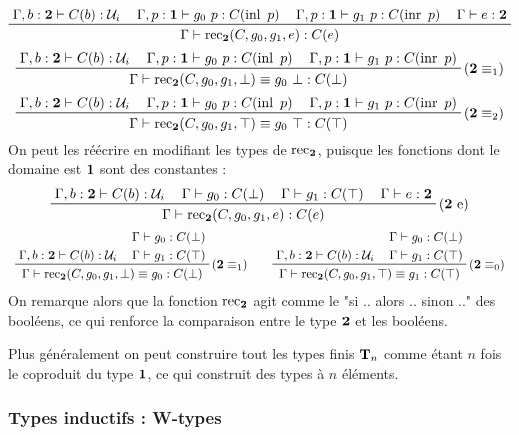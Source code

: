 \documentclass[../../rapport.tex]{subfiles}
\begin{document}
\begin{example}[Le type $\2$]
    $$
    \prfinterspace=1.2em
    \prftree
      {\Gamma, b : \2 \vdash C(b) :\U_i}
      {\Gamma, p : \1 \vdash g_0\ p : C(\inl\ p)}
      {\Gamma, p : \1 \vdash g_1\ p : C(\inr\ p)}
      {\Gamma \vdash e : \2}
      {\Gamma \vdash \rec_{\2}(C, g_0, g_1, e) : C(e)}
    $$
    $$
    \prfinterspace=1.2em
    \prftree[r]{($\2 \equiv_1$)}
      {\Gamma, b: \2 \vdash C(b) : \U_i}
      {\Gamma, p : \1 \vdash g_0\ p : C(\inl\ p)}
      {\Gamma, p : \1 \vdash g_1\ p : C(\inr\ p)}
    {\Gamma \vdash \rec_{\2}(C, g_0, g_1, \bot) \equiv g_0\ \bot : C(\bot)}
    $$
    $$
    \prfinterspace=1.2em
    \prftree[r]{($\2 \equiv_2$)}
      {\Gamma, b: \2 \vdash C(b) : \U_i}
      {\Gamma, p : \1 \vdash g_0\ p : C(\inl\ p)}
      {\Gamma, p : \1 \vdash g_1\ p : C(\inr\ p)}
    {\Gamma \vdash \rec_{\2}(C, g_0, g_1, \top) \equiv g_0\ \top : C(\top)}
    $$
    On peut les réécrire en modifiant les types de $\operatorname{rec}_{\operatorname{\textbf{2}}}$, puisque les fonctions dont le domaine est $\operatorname{\textbf{1}}$ sont des constantes :
    $$
    \prfinterspace=1.2em
    \prftree[r]{($\2$ e)}
      {\Gamma, b : \2 \vdash C(b) :\U_i}
      {\Gamma \vdash g_0: C(\bot)}
      {\Gamma \vdash g_1 : C(\top)}
      {\Gamma \vdash e : \2}
      {\Gamma \vdash \rec_{\2}(C, g_0, g_1, e) : C(e)}
    $$
    $$\begin{array}{cc}
      \prfinterspace=1.2em
      \prftree[r]{($\2 \equiv_1$)}
	{\Gamma, b : \2 \vdash C(b) : \U_i}
	{\prfStackPremises{\Gamma \vdash g_0 : C(\bot)}
	{\Gamma \vdash g_1 : C(\top)}}
      {\Gamma \vdash \rec_{\2}(C, g_0, g_1, \bot) \equiv g_0 : C(\bot)} \hspace{1em}
      &
      \prfinterspace=1.2em
      \prftree[r]{($\2 \equiv_0$)}
	{\Gamma, b : \2 \vdash C(b) : \U_i}
	{\prfStackPremises{\Gamma \vdash g_0 : C(\bot)}
	{\Gamma \vdash g_1 : C(\top)}}
      {\Gamma \vdash \rec_{\2}(C, g_0, g_1, \top) \equiv g_1 : C(\top)}
    \end{array}$$
    On remarque alors que la fonction $\operatorname{rec}_{\operatorname{\textbf{2}}}$ agit comme le "si .. alors .. sinon .." des booléens,
    ce qui renforce la comparaison entre le type $\2$ et les booléens.
  \end{example}

  Plus généralement on peut construire tout les types finis $\mathbf T_n$ comme étant $n$ fois le coproduit du type $\operatorname{\textbf{1}}$,
  ce qui construit des types à $n$ éléments.

  \subsubsection{Types inductifs : W-types}
\end{document}
